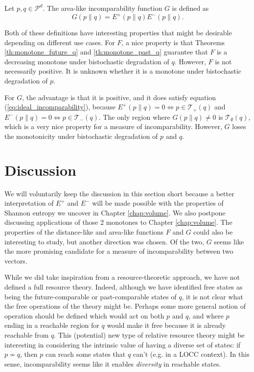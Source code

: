 \begin{definition} \label{def:area-like_function}
    Let $p, q \in \mathcal{P}^d$. The area-like incomparability function $G$ is defined as 
    \begin{equation}
        G(p \parallel q) = E^+(p \parallel q) E^-(p \parallel q).
    \end{equation}
\end{definition}

Both of these definitions have interesting properties that might be desirable depending on different use cases. For $F$, a nice property is that Theorems \ref{th:monotone_future_q} and \ref{th:monotone_past_q} guarantee that $F$ is a decreasing monotone under bistochastic degradation of $q$. However, $F$ is not necessarily positive. It is unknown whether it is a monotone under bistochastic degradation of $p$.

For $G$, the advantage is that it is positive, and it does satisfy equation (\ref{eq:ideal_incomparability}), because $E^+(p \parallel q) = 0 \iff p \in \mathcal{T}_+(q)$ and $E^-(p \parallel q) = 0 \iff p \in \mathcal{T}_-(q)$. The only region where $G(p \parallel q) \neq 0$ is $\mathcal{T}_\emptyset(q)$, which is a very nice property for a measure of incomparability. However, $G$ loses the monotonicity under bistochastic degradation of $p$ and $q$.



\section{Discussion}

We will voluntarily keep the discussion in this section short because a better interpretation of $E^+$ and $E^-$ will be made possible with the properties of Shannon entropy we uncover in Chapter \ref{chap:volume}. We also postpone discussing applications of those 2 monotones to Chapter \ref{chap:volume}. The properties of the distance-like and area-like functions $F$ and $G$ could also be interesting to study, but another direction was chosen. Of the two, $G$ seems like the more promising candidate for a measure of incomparability between two vectors.

While we did take inspiration from a resource-theoretic approach, we have not defined a full resource theory. Indeed, although we have identified free states as being the future-comparable or past-comparable states of $q$, it is not clear what the free operations of the theory might be. Perhaps some more general notion of operation should be defined which would act on both $p$ and $q$, and where $p$ ending in a reachable region for $q$ would make it free because it is already reachable from $q$. This (potential) new type of relative resource theory might be interesting in considering the intrinsic value of having a diverse set of states: if $p \nsim q$, then $p$ can reach some states that $q$ can't (e.g. in a LOCC context). In this sense, incomparability seems like it enables \textit{diversity} in reachable states.

